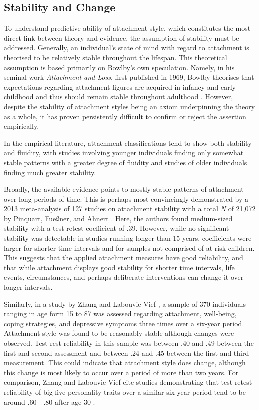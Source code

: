 \documentclass[12pt]{report}
\begin{document}
\subsection{Stability and Change}
To understand predictive ability of attachment style, which constitutes the most direct link between theory and evidence, the assumption of stability must be addressed. Generally, an individual's state of mind with regard to attachment is theorised to be relatively stable throughout the lifespan. This theoretical assumption is based primarily on Bowlby's own speculation. Namely, in his seminal work \textit{Attachment and Loss}, first published in 1969, Bowlby theorises that expectations regarding attachment figures are acquired in infancy and early childhood and thus should remain stable throughout adulthood \cite{Bowlby1969attachment, Bowlby1973separation,Bowlby1980loss}. However, despite the stability of attachment styles being an axiom underpinning the theory as a whole, it has proven persistently difficult to confirm or reject the assertion empirically.

In the empirical literature, attachment classifications tend to show both stability and fluidity, with studies involving younger individuals finding only somewhat stable patterns with a greater degree of fluidity and studies of older individuals finding much greater stability.

Broadly, the available evidence points to mostly stable patterns of attachment over long periods of time. This is perhaps most convincingly demonstrated by a 2013 meta-analysis of 127 studies on attachment stability with a total \textit{N} of 21,072 by Pinquart, Fueßner, and Ahnert \cite{Pinquart2013}.
Here, the authors found medium-sized stability with a test-retest coefficient of .39. However, while no significant stability was detectable in studies running longer than 15 years, coefficients were larger for shorter time intervals and for samples not comprised of at-risk children.
This suggests that the applied attachment measures have good reliability, and that while attachment displays good stability for shorter time intervals, life events, circumstances, and perhaps deliberate interventions can change it over longer intervals.

Similarly, in a study by Zhang and Labouvie-Vief \cite{Zhang2004}, a sample of 370 individuals ranging in age form 15 to 87 was assessed regarding attachment, well-being, coping strategies, and depressive symptoms three times over a six-year period. Attachment style was found to be reasonably stable although changes were observed.
Test-rest reliability in this sample was between .40 and .49 between the first and second assessment and between .24 and .45 between the first and third measurement. This could indicate that attachment style does change, although this change is most likely to occur over a period of more than two years.
For comparison, Zhang and Labouvie-Vief cite studies demonstrating that test-retest reliability of big five personality traits over a similar six-year period tend to be around .60 - .80 after age 30 \cite{Costa1988,Roberts2000}.
\end{document}
